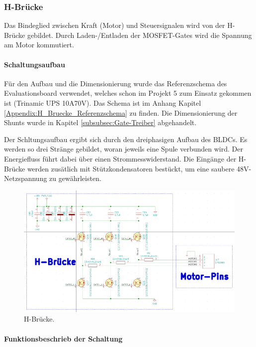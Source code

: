 \subsubsection{H-Brücke}
\label{subsubsec:H-Brücke}

Das Bindeglied zwischen Kraft (Motor) und Steuersignalen wird von der H-Brücke gebildet. Durch Laden-/Entladen der MOSFET-Gates wird die Spannung am Motor kommutiert.

\paragraph{Schaltungsaufbau}\mbox{}

Für den Aufbau und die Dimensionierung wurde das Referenzschema des Evaluationsboard verwendet, welches schon im Projekt 5 zum Einsatz gekommen ist (Trinamic UPS 10A70V). Das Schema ist im Anhang Kapitel \ref{Appendix:H_Bruecke_Referenzschema} zu finden. Die Dimensionierung der Shunts wurde in Kapitel \ref{subsubsec:Gate-Treiber} abgehandelt.

Der Schltungsaufbau ergibt sich durch den dreiphasigen Aufbau des BLDCs. Es werden so drei Stränge gebildet, woran jeweils eine Spule verbunden wird. Der Energiefluss führt dabei über einen Strommesswiderstand. Die Eingänge der H-Brücke werden zusätlich mit Stützkondensatoren bestückt, um eine saubere 48V-Netzspannung zu gewährleisten.

\begin{figure}[H]
	\centering
	\includegraphics[width=\textwidth]{graphics/Schema_H_Bruecke_und_BLDC}
	\caption{H-Brücke.}
	\label{fig:Schema_H_Bruecke_und_BLDC}
\end{figure}

\paragraph{Funktionsbeschrieb der Schaltung}\mbox{}


